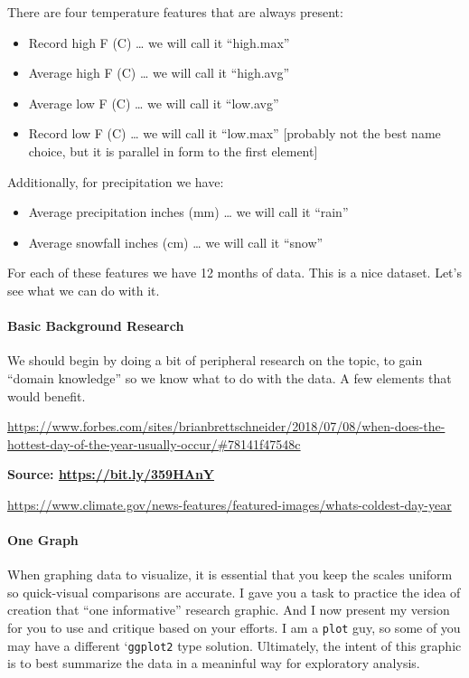 \documentclass[
]{article}
\providecommand{\tightlist}{%
  \setlength{\itemsep}{0pt}\setlength{\parskip}{0pt}}
\begin{document}
There are four temperature features that are always present:

\begin{itemize}
\tightlist
\item
  Record high F (C) \ldots{} we will call it ``high.max''
\item
  Average high F (C) \ldots{} we will call it ``high.avg''
\item
  Average low F (C) \ldots{} we will call it ``low.avg''
\item
  Record low F (C) \ldots{} we will call it ``low.max'' {[}probably not
  the best name choice, but it is parallel in form to the first
  element{]}
\end{itemize}

Additionally, for precipitation we have:

\begin{itemize}
\tightlist
\item
  Average precipitation inches (mm) \ldots{} we will call it ``rain''
\item
  Average snowfall inches (cm) \ldots{} we will call it ``snow''
\end{itemize}

For each of these features we have 12 months of data. This is a nice
dataset. Let's see what we can do with it.

\hypertarget{basic-background-research}{%
\paragraph{Basic Background Research}\label{basic-background-research}}

We should begin by doing a bit of peripheral research on the topic, to
gain ``domain knowledge'' so we know what to do with the data. A few
elements that would benefit.

\url{https://www.forbes.com/sites/brianbrettschneider/2018/07/08/when-does-the-hottest-day-of-the-year-usually-occur/\#78141f47548c}

\textbf{Source: \url{https://bit.ly/359HAnY}}

\url{https://www.climate.gov/news-features/featured-images/whats-coldest-day-year}

\hypertarget{one-graph}{%
\paragraph{One Graph}\label{one-graph}}

When graphing data to visualize, it is essential that you keep the
scales uniform so quick-visual comparisons are accurate. I gave you a
task to practice the idea of creation that ``one informative'' research
graphic. And I now present my version for you to use and critique based
on your efforts. I am a \texttt{plot} guy, so some of you may have a
different `\texttt{ggplot2} type solution. Ultimately, the intent of
this graphic is to best summarize the data in a meaninful way for
exploratory analysis.
\end{document}
